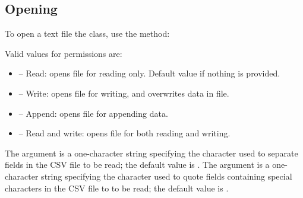 \documentclass[a4paper,10pt,openany,english]{sphinxmanual}
\begin{document}
\subsection{Opening}
\label{tutorial:id2}
To open a text file the {\hyperref[egadsapi:egads.input.text_file_io.EgadsCsv]{}} class, use the  method:

\begin{sphinxVerbatim}[commandchars=\\\{\}]
 
  
\end{sphinxVerbatim}

Valid values for permissions are:
\begin{itemize}
\item {} 
 -- Read: opens file for reading only. Default value if nothing is provided.

\item {} 
 -- Write: opens file for writing, and overwrites data in file.

\item {} 
 -- Append: opens file for appending data.

\item {} 
 -- Read and write: opens file for both reading and writing.

\end{itemize}

The  argument is a one-character string specifying the character used to separate fields in the CSV file to be read; the default value is \sphinxcode{,}. The  argument is a one-character string specifying the character used to quote fields containing special characters in the CSV file to to be read; the default value is .
\end{document}
